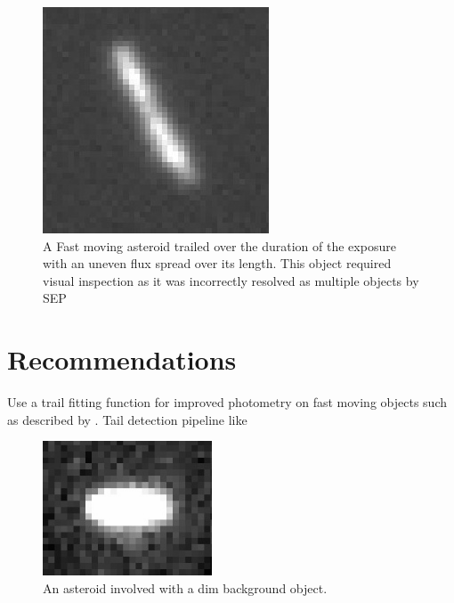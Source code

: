 \documentclass[iop,apj]{emulateapj}
\begin{document}
\begin{figure}[!htb]
    \centering
    \includegraphics[width=0.4\linewidth]{images/flux_spread.png}
    \caption{A Fast moving asteroid trailed over the duration of the exposure with an uneven flux spread over its length. This object required visual inspection as  it was incorrectly resolved as multiple objects by SEP}\label{fig:4}
\end{figure}

\section{Recommendations }

Use a trail fitting function for improved photometry on fast moving objects such as described by \cite{veres12}.
Tail detection pipeline like \cite{sonnett11}








\begin{figure}[!htb]
    \centering
    \includegraphics[height=4cm]{images/background_gal.jpeg}
    \caption{An asteroid involved with a dim background object. }\label{fig:3}
\end{figure}
\end{document}
